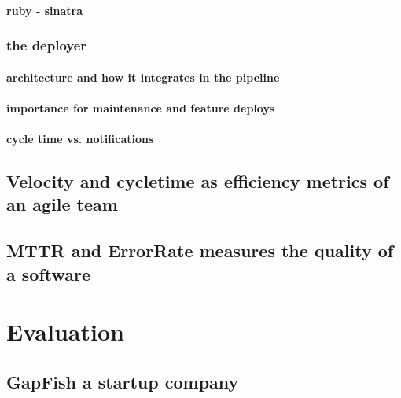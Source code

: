 \subsection{ruby - sinatra}

\section{the deployer}
\subsection{architecture and how it integrates in the pipeline}
\subsection{importance for maintenance and feature deploys}
\subsection{cycle time vs. notifications}

\chapter{Velocity and cycletime as efficiency metrics of an agile team}
\chapter{MTTR and ErrorRate measures the quality of a software}


\part{Evaluation}
\chapter{GapFish a startup company}
